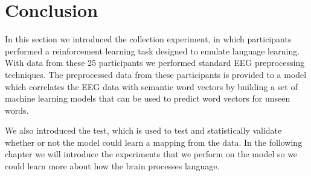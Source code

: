 \section{Conclusion}
In this section we introduced the collection experiment, in which participants 
performed a reinforcement learning task designed to emulate language learning.
With data from these 25 participants we performed standard EEG preprocessing 
techniques. The preprocessed data from these participants is provided to a model
which correlates the EEG data with semantic word vectors by building a set of 
machine learning models that can be used to predict word vectors for unseen 
words.

We also introduced the \tvt test, which is used to test and statistically 
validate whether or not the model could learn a mapping from the data. In the 
following chapter we will introduce the experiments that we perform on the 
model so we could learn more about how the brain processes language.
